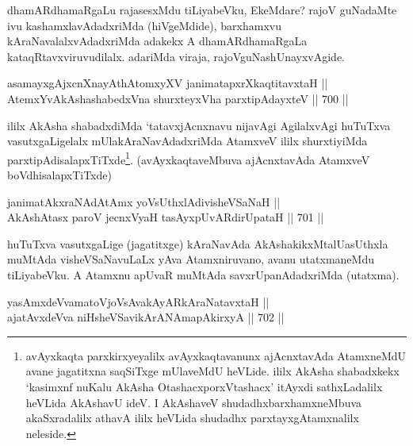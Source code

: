 \begin{artha} 
dhamARdhamaRgaLu rajasesxMdu tiLiyabeVku, EkeMdare? rajoV guNadaMte ivu kashamxlavAdadxriMda (hiVgeMdide), barxhamxvu kAraNavalalxvAdadxriMda adakekx A dhamARdhamaRgaLa kataqRtavxviruvudilalx. adariMda viraja, rajoVguNashUnayxvAgide.
\end{artha}


\begin{shl}
asamayxgAjxcnXnayAthAtomxyXV janimatapxrXkaqtitavxtaH || \\
AtemxYvA\s \s kAshashabedxVna shurxteyxVha parxtipAdayxteV \hfill || 700 ||  
\end{shl}

\begin{artha} 
ililx AkAsha shabadxdiMda `tatavxjAcnxnavu nijavAgi AgilalxvAgi 
huTuTxva vasutxgaLigelalx mUlakAraNavAdadxriMda AtamxveV ililx 
shurxtiyiMda parxtipAdisalapxTiTxde\footnote{avAyxkaqta 
parxkirxyeyalilx avAyxkaqtavanunx ajAcnxtavAda AtamxneMdU avane 
jagatitxna saqSiTxge mUlaveMdU heVLide. ililx AkAsha shabadxkekx 
`kasimxnf nuKalu AkAsha OtashacxporxVtashacx' itAyxdi sathxLadalilx heVLida AkAshavU ideV. I AkAshaveV 
shudadhxbarxhamxneMbuva akaSxradalilx athavA ililx heVLida shudadhx 
parxtayxgAtamxnalilx neleside.}. (avAyxkaqtaveMbuva 
ajAcnxtavAda AtamxveV boVdhisalapxTiTxde)
\end{artha}


\begin{shl}
janimatAkxraNAdAtAmx yoV\s sUthxlAdivisheVSaNaH || \\
AkAshAtasx paroV jecnxVyaH \footnotemark[2]tasAyxpUvARdirUpataH \hfill || 701 ||  
\end{shl}

\begin{artha} 
huTuTxva vasutxgaLige (jagatitxge) kAraNavAda AkAshakikxMtalU\break asUthxla muMtAda visheVSaNavuLaLx yAva Atamxniruvano, avanu utatxmaneMdu tiLiyabeVku. A Atamxnu apUvaR muMtAda savxrUpanAdadxriMda (utatxma).
\end{artha}


\begin{shl}
yasAmxdeVvamatoV\s joV\s sAvakAyARkAraNatavxtaH || \\
ajatAvxdeVva niHsheVSavikArANAmapAkirxyA \hfill || 702 ||  
\end{shl}

